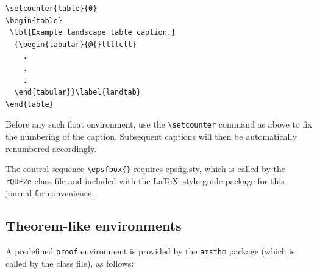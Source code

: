 \documentclass{rQUF2e}
\theoremstyle{plain}
\theoremstyle{definition}
\theoremstyle{remark}
\begin{document}
\begin{verbatim}
\setcounter{table}{0}
\begin{table}
 \tbl{Example landscape table caption.}
  {\begin{tabular}{@{}llllcll}
    .
    .
    .
  \end{tabular}}\label{landtab}
\end{table}
\end{verbatim}
Before any such float environment, use the \verb"\setcounter" command
as above to fix the numbering of the caption. Subsequent captions
will then be automatically renumbered accordingly.

The control sequence \verb"\epsfbox{}" requires epsfig.sty, which is called by the \texttt{rQUF2e} class file and included with the \LaTeX\ style guide package for this journal for convenience.


\subsection{Theorem-like environments}

A predefined \verb"proof" environment is provided by the \texttt{amsthm} package (which is called by the class file), as follows:
\end{document}
